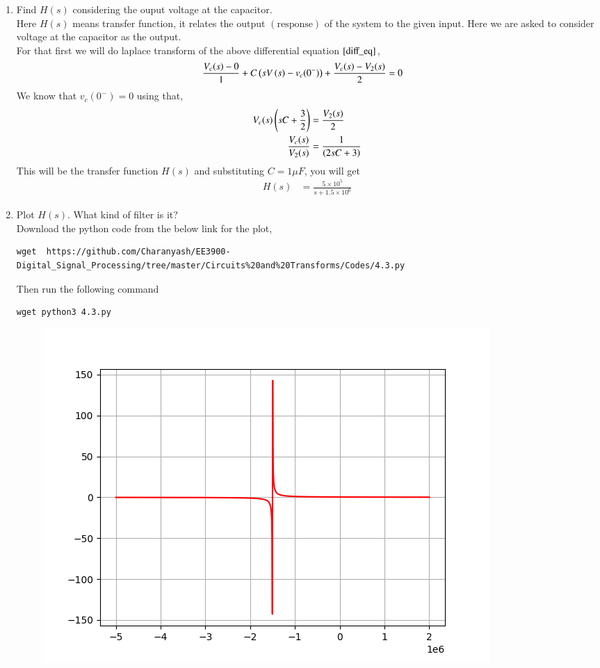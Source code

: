 \documentclass[journal,12pt,twocolumn]{IEEEtran}
\renewcommand\thesection{\arabic{section}}
\begin{document}
\begin{enumerate}[label=\arabic*.,ref=\thesection.\theenumi]
 \item Find $H(s)$ considering the ouput voltage at the capacitor.\\
	 \solution Here $H(s)$ means transfer function, it relates the output $(\text{response})$ of the system to the given input. Here we are asked to consider voltage at the capacitor as the output. \\
	 For that first we will do laplace transform of the above differential equation $\eqref{diff_eq}$,
	  \begin{align}
		  \frac{V_c(s) -0}{1} + C\left(sV\left(s\right) - v_c(0^-)\right) + \frac{V_c(s) - V_2(s)}{2} &= 0
	  \end{align}
	  We know that  $v_c(0^-) = 0$ using that,
          \begin{align}
		  V_c(s)\left(sC + \frac{3}{2}\right) &= \frac{V_2(s)}{2} \\
		  \frac{V_c(s)}{V_2(s)} &= \frac{1}{\left(2sC + 3\right)}
	  \end{align}
         This will be the transfer function $H(s)$ and substituting $C = 1 \mu F$, you will get
	  \begin{align}
                H(s) &= \frac{5 \times 10^5}{s + 1.5 \times 10^6}
	  \end{align}
  \item Plot $H(s)$.  What kind of filter is it?\\
   \solution Download the python code from the below link for the plot,
           \begin{lstlisting} 
wget  https://github.com/Charanyash/EE3900-Digital_Signal_Processing/tree/master/Circuits%20and%20Transforms/Codes/4.3.py
	      \end{lstlisting}
	      Then run the following command
	 \begin{lstlisting}
wget python3 4.3.py
        \end{lstlisting}
	  \begin{figure}
	    \centering
	    \includegraphics[width = \columnwidth]{Figs/4.3.png}

\end{figure}
\end{enumerate}
\end{document}
